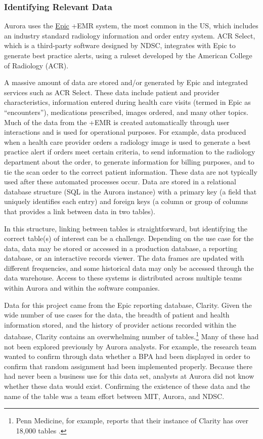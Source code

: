 \documentclass[
]{WileySix}
\begin{document}
\hypertarget{identifying-relevant-data}{%
\subsubsection{Identifying Relevant Data}\label{identifying-relevant-data}}

Aurora uses the \href{https://www.epic.com/}{Epic} +EMR\textbar{} system, the most common in the US, which includes an industry standard radiology information and order entry system. ACR Select, which is a third-party software designed by NDSC, integrates with Epic to generate best practice alerts, using a ruleset developed by the American College of Radiology (ACR).

A massive amount of data are stored and/or generated by Epic and integrated services such as ACR Select. These data include patient and provider characteristics, information entered during health care visits (termed in Epic as ``encounters''), medications prescribed, images ordered, and many other topics. Much of the data from the +EMR\textbar{} is created automatically through user interactions and is used for operational purposes. For example, data produced when a health care provider orders a radiology image is used to generate a best practice alert if orders meet certain criteria, to send information to the radiology department about the order, to generate information for billing purposes, and to tie the scan order to the correct patient information. These data are not typically used after these automated processes occur. Data are stored in a relational database structure (SQL in the Aurora instance) with a primary key (a field that uniquely identifies each entry) and foreign keys (a column or group of columns that provides a link between data in two tables).

In this structure, linking between tables is straightforward, but identifying the correct table(s) of interest can be a challenge. Depending on the use case for the data, data may be stored or accessed in a production database, a reporting database, or an interactive records viewer. The data frames are updated with different frequencies, and some historical data may only be accessed through the data warehouse. Access to these systems is distributed across multiple teams within Aurora and within the software companies.

Data for this project came from the Epic reporting database, Clarity. Given the wide number of use cases for the data, the breadth of patient and health information stored, and the history of provider actions recorded within the database, Clarity contains an overwhelming number of tables.\footnote{Penn Medicine, for example, reports that their instance of Clarity has over 18,000 tables \citep{pennmedicineinformationsystemsdataanalyticscenter}.} Many of these had not been explored previously by Aurora analysts. For example, the research team wanted to confirm through data whether a BPA had been displayed in order to confirm that random assignment had been implemented properly. Because there had never been a business use for this data set, analysts at Aurora did not know whether these data would exist. Confirming the existence of these data and the name of the table was a team effort between MIT, Aurora, and NDSC.
\end{document}
